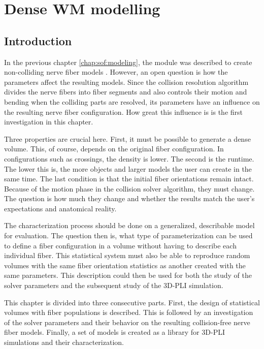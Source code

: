 \setcounter{chapter}{6}
\chapter{Dense \acs{WM} modelling}
\label{cha:model_analysis}
%
\section{Introduction}
%
In the previous chapter \cref{chap:sof:modeling}, the module  was described to create non-colliding nerve fiber models \cite{Matuschke2019, Matuschke2021}.
However, an open question is how the parameters affect the resulting models.
Since the collision resolution algorithm divides the nerve fibers into fiber segments and also controls their motion and bending when the colliding parts are resolved, its parameters have an influence on the resulting nerve fiber configuration.
How great this influence is is the first investigation in this chapter.
\par
%
Three properties are crucial here.
First, it must be possible to generate a dense volume.
This, of course, depends on the original fiber configuration.
In configurations  such as crossings, the density is lower.
The second is the runtime.
The lower this is, the more objects and larger models the user can create in the same time.
The last condition is that the initial fiber orientations remain intact.
Because of the motion phase in the collision solver algorithm, they must change.
The question is how much they change and whether the results match the user's expectations and anatomical reality.
\par
%
The characterization process should be done on a generalized, describable model for evaluation.
The question then is, what type of parameterization can be used to define a fiber configuration in a volume without having to describe each individual fiber.
This statistical system must also be able to reproduce random volumes with the same fiber orientation statistics as another created with the same parameters.
This description could then be used for both the study of the solver parameters and the subsequent study of the \ac{3D-PLI} simulation.
\par
%
This chapter is divided into three consecutive parts.
First, the design of statistical volumes with fiber populations is described.
This is followed by an investigation of the solver parameters and their behavior on the resulting collision-free nerve fiber models.
Finally, a set of models is created as a library for \ac{3D-PLI} simulations and their characterization.
%
%
%
